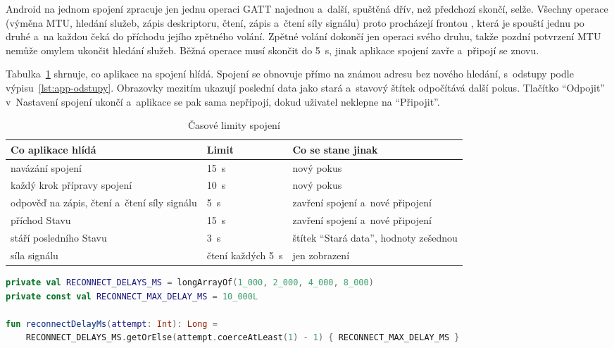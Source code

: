 Android na jednom spojení zpracuje jen jednu operaci GATT najednou a~další, spuštěná dřív, než
předchozí skončí, selže. Všechny operace (výměna MTU, hledání služeb, zápis deskriptoru, čtení,
zápis a~čtení síly signálu) proto procházejí frontou , která je spouští
jednu po druhé a~na každou čeká do příchodu jejího zpětného volání. Zpětné volání dokončí jen
operaci svého druhu, takže pozdní potvrzení MTU nemůže omylem ukončit hledání služeb. Běžná
operace musí skončit do 5~s, jinak aplikace spojení zavře a~připojí se znovu.

Tabulka~\ref{tab:app-limity} shrnuje, co aplikace na spojení hlídá. Spojení se obnovuje přímo na
známou adresu bez nového hledání, s~odstupy podle výpisu~\ref{lst:app-odstupy}. Obrazovky
mezitím ukazují poslední data jako stará a~stavový štítek odpočítává další pokus. Tlačítko
\enquote{Odpojit} v~Nastavení spojení ukončí a~aplikace se pak sama nepřipojí, dokud uživatel
neklepne na \enquote{Připojit}.

\begin{table}[H]
\centering
\caption{Časové limity spojení}
\label{tab:app-limity}
\begin{tabular}{|p{}|p{}|p{}|}
\hline
\textbf{Co aplikace hlídá} & \textbf{Limit} & \textbf{Co se stane jinak} \\ \hline
navázání spojení & 15~s & nový pokus \\ \hline
každý krok přípravy spojení & 10~s & nový pokus \\ \hline
odpověď na zápis, čtení a~čtení síly signálu & 5~s & zavření spojení a~nové připojení \\ \hline
příchod Stavu & 15~s & zavření spojení a~nové připojení \\ \hline
stáří posledního Stavu & 3~s & štítek \enquote{Stará data}, hodnoty zešednou \\ \hline
síla signálu & čtení každých 5~s & jen zobrazení \\ \hline
\end{tabular}
\end{table}

\begin{lstlisting}[language=kotlin, breaklines=true, caption={Odstupy mezi pokusy o~připojení}, label=lst:app-odstupy]
private val RECONNECT_DELAYS_MS = longArrayOf(1_000, 2_000, 4_000, 8_000)
private const val RECONNECT_MAX_DELAY_MS = 10_000L

fun reconnectDelayMs(attempt: Int): Long =
    RECONNECT_DELAYS_MS.getOrElse(attempt.coerceAtLeast(1) - 1) { RECONNECT_MAX_DELAY_MS }
\end{lstlisting}

